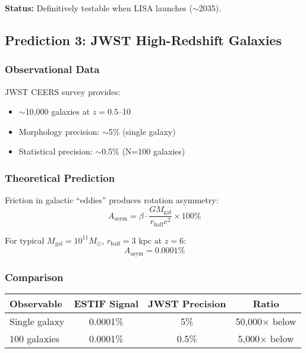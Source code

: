 \documentclass[12pt]{article}
\begin{document}
\textbf{Status:} Definitively testable when LISA launches ($\sim$2035).

\subsection{Prediction 3: JWST High-Redshift Galaxies}

\subsubsection{Observational Data}

JWST CEERS survey \cite{Finkelstein2022} provides:
\begin{itemize}
    \item $\sim$10,000 galaxies at $z = 0.5$--10
    \item Morphology precision: $\sim$5\% (single galaxy)
    \item Statistical precision: $\sim$0.5\% (N=100 galaxies)
\end{itemize}

\subsubsection{Theoretical Prediction}

Friction in galactic ``eddies'' produces rotation asymmetry:
\begin{equation}
A_{\text{asym}} = \beta \cdot \frac{GM_{\text{gal}}}{r_{\text{half}} c^2} \times 100\%
\end{equation}

For typical $M_{\text{gal}} = 10^{11} M_\odot$, $r_{\text{half}} = 3$ kpc at $z = 6$:
\begin{equation}
A_{\text{asym}} = 0.0001\%
\end{equation}

\subsubsection{Comparison}

\begin{center}
\begin{tabular}{lccc}
\hline
Observable & ESTIF Signal & JWST Precision & Ratio \\
\hline
Single galaxy & 0.0001\% & 5\% & 50,000$\times$ below \\
100 galaxies & 0.0001\% & 0.5\% & 5,000$\times$ below \\
\hline
\end{tabular}
\end{center}
\end{document}
